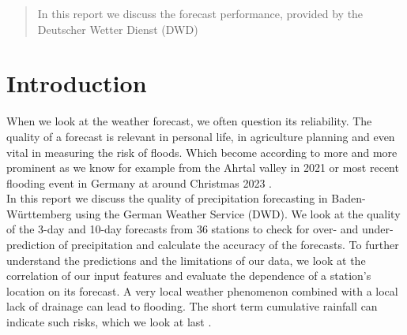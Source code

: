 \documentclass{article}
\theoremstyle{plain}
\theoremstyle{definition}
\theoremstyle{remark}
\begin{document}
\printAffiliationsAndNotice{\icmlEqualContribution}

\begin{abstract}
    In this report we discuss the forecast performance, provided by the Deutscher
    Wetter Dienst (DWD)


\end{abstract}

\section{Introduction}\label{sec:intro}
When we look at the weather forecast, we often question its reliability. The
quality of a forecast is relevant in personal life, in agriculture planning and
even vital in measuring the risk of floods. Which become according to
\cite{FloodTrends} more and more prominent as we know for example from the
Ahrtal valley in 2021 \cite{pink} or most recent flooding event in Germany at
around Christmas 2023 \cite{flooding_christmas}. \\

In this report we discuss the quality of precipitation forecasting in
Baden-Württemberg using the German Weather Service (DWD).
We look at the quality of the 3-day and 10-day forecasts from 36 stations to
check for over- and under-prediction of precipitation and calculate the
accuracy of the forecasts.
To further understand the predictions and the limitations of our data, we look
at the correlation of our input features and evaluate the dependence of a
station's location on its forecast.
A very local weather phenomenon combined with a local lack of drainage can lead
to flooding. The short term cumulative rainfall can indicate such risks, which
we look at last \cite{pink}. %
\end{document}
